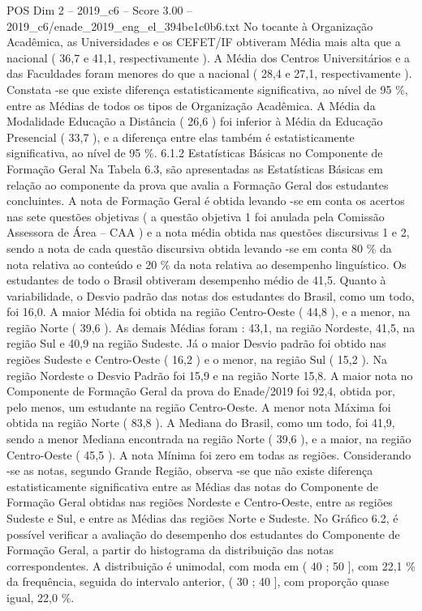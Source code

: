 \begin{textsample}{POS Dim 2 – 2019\_c6 – Score 3.00 – 2019\_c6/enade\_2019\_eng\_el\_394be1c0b6.txt}
No tocante à Organização Acadêmica, as Universidades e os CEFET/IF obtiveram Média mais alta que a nacional ( 36,7 e 41,1, respectivamente ).
A Média dos Centros Universitários e a das Faculdades foram menores do que a nacional ( 28,4 e 27,1, respectivamente ).
Constata -se que existe diferença estatisticamente significativa, ao nível de 95 \%, entre as Médias de todos os tipos de Organização Acadêmica.
A Média da Modalidade Educação a Distância ( 26,6 ) foi inferior à Média da Educação Presencial ( 33,7 ), e a diferença entre elas também é estatisticamente significativa, ao nível de 95 \%. 6.1.2 Estatísticas Básicas no Componente de Formação Geral Na Tabela 6.3, são apresentadas as Estatísticas Básicas em relação ao componente da prova que avalia a Formação Geral dos estudantes concluintes.
A nota de Formação Geral é obtida levando -se em conta os acertos nas sete questões objetivas ( a questão objetiva 1 foi anulada pela Comissão Assessora de Área – CAA ) e a nota média obtida nas questões discursivas 1 e 2, sendo a nota de cada questão discursiva obtida levando -se em conta 80 \% da nota relativa ao conteúdo e 20 \% da nota relativa ao desempenho linguístico.
Os estudantes de todo o Brasil obtiveram desempenho médio de 41,5.
Quanto à variabilidade, o Desvio padrão das notas dos estudantes do Brasil, como um todo, foi 16,0.
A maior Média foi obtida na região Centro-Oeste ( 44,8 ), e a menor, na região Norte ( 39,6 ).
As demais Médias foram : 43,1, na região Nordeste, 41,5, na região Sul e 40,9 na região Sudeste.
Já o maior Desvio padrão foi obtido nas regiões Sudeste e Centro-Oeste ( 16,2 ) e o menor, na região Sul ( 15,2 ).
Na região Nordeste o Desvio Padrão foi 15,9 e na região Norte 15,8.
A maior nota no Componente de Formação Geral da prova do Enade/2019 foi 92,4, obtida por, pelo menos, um estudante na região Centro-Oeste.
A menor nota Máxima foi obtida na região Norte ( 83,8 ).
A Mediana do Brasil, como um todo, foi 41,9, sendo a menor Mediana encontrada na região Norte ( 39,6 ), e a maior, na região Centro-Oeste ( 45,5 ).
A nota Mínima foi zero em todas as regiões.
Considerando -se as notas, segundo Grande Região, observa -se que não existe diferença estatisticamente significativa entre as Médias das notas do Componente de Formação Geral obtidas nas regiões Nordeste e Centro-Oeste, entre as regiões Sudeste e Sul, e entre as Médias das regiões Norte e Sudeste.
No Gráfico 6.2, é possível verificar a avaliação do desempenho dos estudantes do Componente de Formação Geral, a partir do histograma da distribuição das notas correspondentes.
A distribuição é unimodal, com moda em ( 40 ; 50 ], com 22,1 \% da frequência, seguida do intervalo anterior, ( 30 ; 40 ], com proporção quase igual, 22,0 \%.

\end{textsample}
